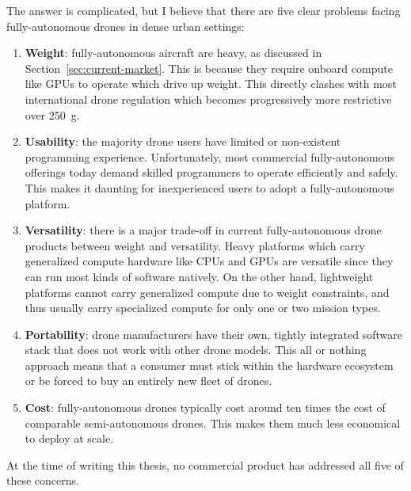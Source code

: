 The answer is complicated, but I believe that there are five clear problems facing fully-autonomous drones in dense urban settings: \\[0.1]
\begin{enumerate}
    \item \textbf{Weight}: fully-autonomous aircraft are heavy, as discussed in Section~\ref{sec:current-market}. This is because they require onboard compute like GPUs to operate which drive up weight. This directly clashes with most international drone regulation which becomes progressively more restrictive over 250~g. \\[0.1]
    \item \textbf{Usability}: the majority drone users have limited or non-existent programming experience. Unfortunately, most commercial fully-autonomous offerings today demand skilled programmers to operate efficiently and safely. This makes it daunting for inexperienced users to adopt a fully-autonomous platform. \\[0.1]
    \item \textbf{Versatility}: there is a major trade-off in current fully-autonomous drone products between weight and versatility. Heavy platforms which carry generalized compute hardware like CPUs and GPUs are versatile since they can run most kinds of software natively. On the other hand, lightweight platforms cannot carry generalized compute due to weight constraints, and thus usually carry specialized compute for only one or two mission types. \\[0.1]
    \item \textbf{Portability}: drone manufacturers have their own, tightly integrated software stack that does not work with other drone models. This all or nothing approach means that a consumer must stick within the hardware ecosystem or be forced to buy an entirely new fleet of drones. \\[0.1]
    \item \textbf{Cost}: fully-autonomous drones typically cost around ten times the cost of comparable semi-autonomous drones. This makes them much less economical to deploy at scale. 
    \\[0.1]
\end{enumerate}
At the time of writing this thesis, no commercial product has addressed all five of these concerns.


